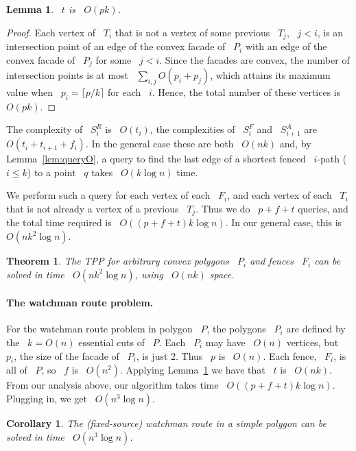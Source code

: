 \documentclass[11pt]{article}
\newtheorem{theorem}{Theorem}
\newtheorem{lemma}{Lemma}
\newtheorem{corollary}{Corollary}
\begin{document}
\begin{lemma}
\label{lem:tOpk}
~\(t\) is ~\(O(pk)\).
\end{lemma}

\begin{proof}
Each vertex of ~\(T_i\) that is not a vertex of some previous ~\(T_j\), ~\(j < i\), is an intersection point of an edge of the convex facade of ~\(P_i\) with an edge of the convex facade of ~\(P_j\) for some ~\(j < i\).
Since the facades are convex, the number of intersection points is at most ~\(\sum_{i,j} O(p_i + p_j)\), which attains its maximum value when ~\(p_i = \lceil p/k \rceil\) for each ~\(i\).
Hence, the total number of these vertices is ~\(O(pk)\).
\end{proof}

The complexity of ~\(S_i^R\) is ~\(O(t_i)\), the complexities of ~\(S_i^F\) and ~\(S_{i+1}^A\) are ~\(O(t_i + t_{i+1} + f_i)\).
In the general case these are both ~\(O(nk)\) and, by Lemma~\ref{lem:queryO}, a query to find the last edge of a shortest fenced ~\(i\)-path (~\(i \le k\)) to a point ~\(q\) takes ~\(O(k\log n)\) time.

We perform such a query for each vertex of each ~\(F_i\), and each vertex of each ~\(T_i\) that is not already a vertex of a previous ~\(T_j\).
Thus we do ~\(p + f + t\) queries, and the total time required is ~\(O((p+f+t)k\log n)\).
In our general case, this is ~\(O(nk^2\log n)\).

\begin{theorem}
\label{thm:general}
The TPP for arbitrary convex polygons ~\(P_i\) and fences ~\(F_i\) can be solved in time ~\(O(nk^2\log n)\), using ~\(O(nk)\) space.
\end{theorem}

\paragraph{The watchman route problem.}
For the watchman route problem in polygon ~\(P\), the polygons ~\(P_i\) are defined by the ~\(k = O(n)\) essential cuts of ~\(P\).
Each ~\(P_i\) may have ~\(O(n)\) vertices, but ~\(p_i\), the size of the facade of ~\(P_i\), is just 2.
Thus ~\(p\) is ~\(O(n)\).
Each fence, ~\(F_i\), is all of ~\(P\), so ~\(f\) is ~\(O(n^2)\).
Applying Lemma~\ref{lem:tOpk} we have that ~\(t\) is ~\(O(nk)\).
From our analysis above, our algorithm takes time ~\(O((p+f+t)k\log n)\).
Plugging in, we get ~\(O(n^3\log n)\).

\begin{corollary}
The (fixed-source) watchman route in a simple polygon can be solved in time ~\(O(n^3\log n)\).
\end{corollary}
\end{document}
